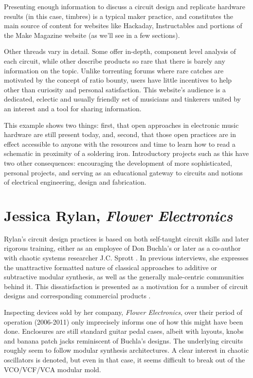 Presenting enough information to discuss a circuit design and replicate hardware results (in this case, timbres) is a typical maker practice, and constitutes the main source of content for websites like Hackaday, Instructables and portions of the Make Magazine website (as we'll see in a few sections). 

Other threads vary in detail. Some offer in-depth, component level analysis of each circuit, while other describe products so rare that there is barely any information on the topic. Unlike torrenting forums where rare catches are motivated by the concept of ratio bounty, users have little incentives to help other than curiosity and personal satisfaction. This website's audience is a dedicated, eclectic and usually friendly set of musicians and tinkerers united by an interest and a tool for sharing information. 

This example shows two things: first, that open approaches in electronic music hardware are still present today, and, second, that those open practices are in effect accessible to anyone with the resources and time to learn how to read a schematic in proximity of a soldering iron. Introductory projects such as this have two other consequences: encouraging the development of more sophisticated, personal projects, and serving as an educational gateway to circuits and notions of electrical engineering, design and  fabrication. 

\section{Jessica Rylan, \textit{Flower Electronics}}

Rylan's circuit design practices is based on both self-taught circuit skills and later rigorous training, either as an employee of Don Buchla's or later as a co-author with chaotic systems researcher J.C. Sprott \citep{piper2010}. In previous interviews, she expresses the unattractive formatted nature of classical approaches to additive or subtractive modular synthesis, as well as the generally male-centric communities behind it. This dissatisfaction is presented as a motivation for a number of circuit designs and corresponding commercial products \citep[pp.139-155]{rodgers2010}. 

Inspecting devices sold by her company, \textit{Flower Electronics}, over their period of operation (2006-2011) only imprecisely informs one of how this might have been done. Enclosures are still standard guitar pedal cases, albeit with layouts, knobs and banana patch jacks reminiscent of Buchla's designs. The underlying circuits roughly seem to follow modular synthesis architectures. A clear interest in chaotic oscillators is denoted, but even in that case, it seems difficult to break out of the VCO/VCF/VCA modular mold. 

